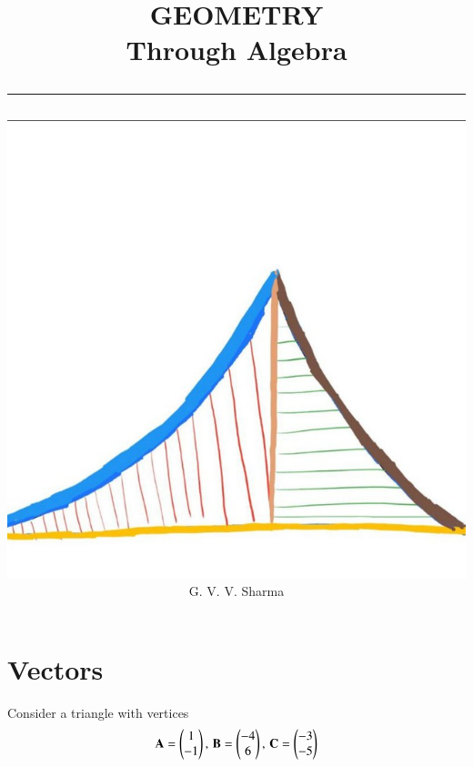 \documentclass[journal]{IEEEtran}
\begin{document}

\onecolumn


\title{
	\begin{flushleft}
	GEOMETRY \\ Through Algebra 
	\\
\rule{0.4\columnwidth}{0.4pt}
\end{flushleft}
}
\author{
\vspace{7cm}
	\begin{flushleft}
\includegraphics[width=0.2\columnwidth]{figs/logo.jpg}
\\
	\huge G. V. V. Sharma
	\end{flushleft}
}
\maketitle

\newpage

\tableofcontents

\newpage
\twocolumn

\section{Vectors}
Consider a triangle with vertices
		\begin{align}
			\label{eq:tri-pts}
			\vec{A} = \myvec{1 \\ -1},\,
			\vec{B} = \myvec{-4 \\ 6},\,
			\vec{C} = \myvec{-3 \\ -5}
		\end{align}

\end{document}
